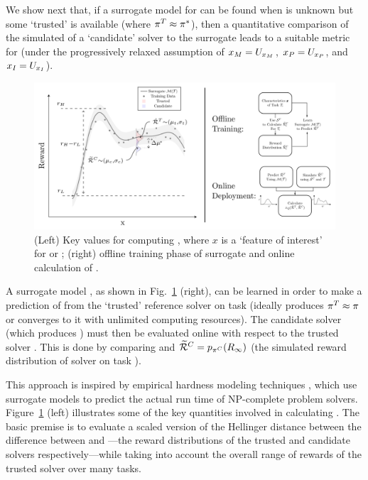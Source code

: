  We show next that, if a surrogate model \rwdpredicted{} for \rwdtrust{} can be found when \piopt{} is unknown but some `trusted' \pitrust{} is available (where $\pi^T \approx \pi^*$), then a quantitative comparison of the simulated \rwdcandsim{} of a `candidate' solver to the surrogate \rwdpredicted{} leads to a suitable metric for \xQ{} (under the progressively relaxed assumption of $x_M=U_{x_M}$, $x_P=U_{x_P}$, and $x_I=U_{x_I}$).\brett{********}
    \begin{figure}[tb]
        \centering
        \includegraphics[width=0.95\linewidth]{Figures/xQ_combined.png}
        \caption{(Left) Key values for computing \xQ, where $x$ is a `feature of interest' for \task or \solve; (right) offline training phase of surrogate \surrogate{} and online calculation of \xQ{}.
        }
        \label{fig:sq_v3}
        \vspace{-0.5cm}
    \end{figure}

A surrogate model \surrogate{}, as shown in Fig.~\ref{fig:sq_v3} (right), can be learned in order to make a prediction \rwdtrustpredict{} of \rwdtrust{} from the `trusted' reference solver \solvetrust{} on task \task{} (ideally \solvetrust{} produces $\mathcal{\pi}^T \approx \mathcal{\pi}$ or converges to it with unlimited computing resources). The candidate solver \solvecand{} (which produces \policycand) must then be evaluated online with respect to the trusted solver \solvetrust{}. This is done by comparing \rwdtrustpredict{} and $\widetilde{\mathcal{R}}^C= p_{\pi^C}(R_{\infty})$ (the simulated reward distribution of solver \solvecand{} on task \task). 

This approach is inspired by empirical hardness modeling techniques \cite{Leyton-Brown2009-yr}, which use surrogate models to predict the actual run time of NP-complete problem solvers. 
Figure~\ref{fig:sq_v3} (left) illustrates some of the key quantities involved in calculating \xQ{}. The basic premise is to evaluate a scaled version of the Hellinger distance between the difference between \rwdtrust{} and \rwd{}---the reward distributions of the trusted and candidate solvers respectively---while taking into account the overall range of rewards of the trusted solver over many tasks. 

